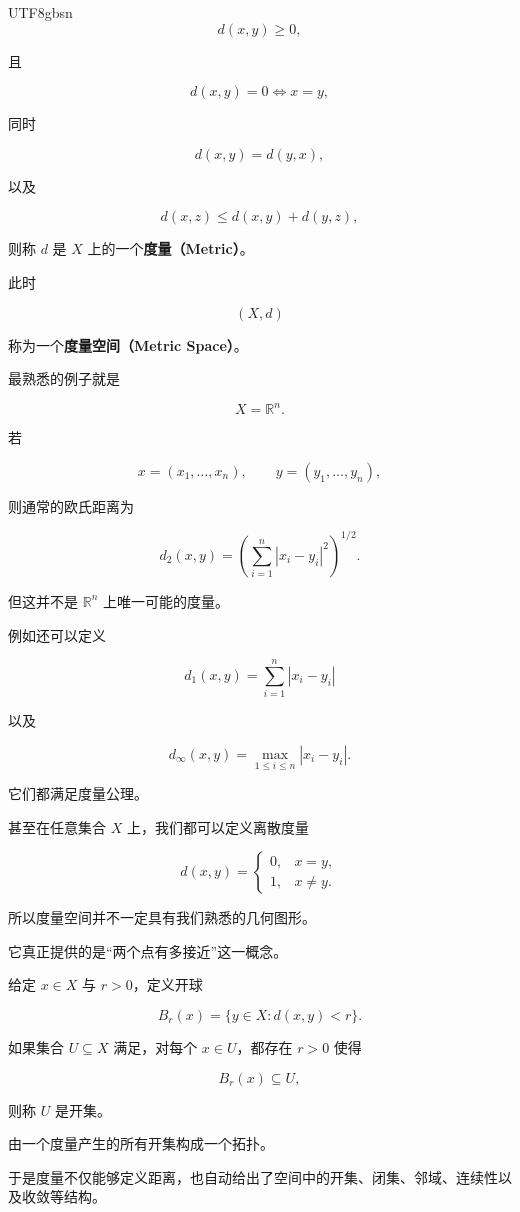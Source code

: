 \documentclass[11pt]{article}
\begin{document}
\begin{CJK*}{UTF8}{gbsn}
\[
d(x,y)\geq0,
\]

且

\[
d(x,y)=0\Longleftrightarrow x=y,
\]

同时

\[
d(x,y)=d(y,x),
\]

以及

\[
d(x,z)\leq d(x,y)+d(y,z),
\]

则称 $d$ 是 $X$ 上的一个\textbf{度量（Metric）}。

此时

\[
(X,d)
\]

称为一个\textbf{度量空间（Metric Space）}。

最熟悉的例子就是

\[
X=\mathbb{R}^{n}.
\]

若

\[
x=(x_{1},\ldots,x_{n}),\qquad y=(y_{1},\ldots,y_{n}),
\]

则通常的欧氏距离为

\[
d_{2}(x,y)=\left(\sum_{i=1}^{n}|x_{i}-y_{i}|^{2}\right)^{1/2}.
\]

但这并不是 $\mathbb{R}^{n}$ 上唯一可能的度量。

例如还可以定义

\[
d_{1}(x,y)=\sum_{i=1}^{n}|x_{i}-y_{i}|
\]

以及

\[
d_{\infty}(x,y)=\max_{1\leq i\leq n}|x_{i}-y_{i}|.
\]

它们都满足度量公理。

甚至在任意集合 $X$ 上，我们都可以定义离散度量

\[
d(x,y)=\begin{cases}0, & x=y,\\ 1, & x\ne y.\end{cases}
\]

所以度量空间并不一定具有我们熟悉的几何图形。

它真正提供的是“两个点有多接近”这一概念。

给定 $x\in X$ 与 $r>0$，定义开球

\[
B_{r}(x)=\{y\in X:d(x,y)<r\}.
\]

如果集合 $U\subseteq X$ 满足，对每个 $x\in U$，都存在 $r>0$ 使得

\[
B_{r}(x)\subseteq U,
\]

则称 $U$ 是开集。

由一个度量产生的所有开集构成一个拓扑。

于是度量不仅能够定义距离，也自动给出了空间中的开集、闭集、邻域、连续性以及收敛等结构。


\end{CJK*}
\end{document}
